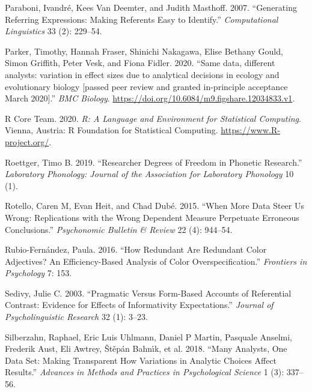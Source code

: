 \documentclass[
  12pt,
]{article}
\newlength{\cslhangindent}
\newenvironment{CSLReferences}[2] %
 {%
  \setlength{\parindent}{0pt}
  \ifodd #1 \everypar{\setlength{\hangindent}{\cslhangindent}}\ignorespaces\fi
  \ifnum #2 > 0
  \setlength{\parskip}{#2\baselineskip}
  \fi
 }%
 {}
\begin{document}
\begin{CSLReferences}{1}{0}
\leavevmode{}%
Paraboni, Ivandré, Kees Van Deemter, and Judith Masthoff. 2007. {``Generating Referring Expressions: Making Referents Easy to Identify.''} \emph{Computational Linguistics} 33 (2): 229--54.

\leavevmode{}%
Parker, Timothy, Hannah Fraser, Shinichi Nakagawa, Elise Bethany Gould, Simon Griffith, Peter Vesk, and Fiona Fidler. 2020. {``{Same data, different analysts: variation in effect sizes due to analytical decisions in ecology and evolutionary biology {[}passed peer review and granted in-principle acceptance March 2020{]}}.''} \emph{BMC Biology}. \url{https://doi.org/10.6084/m9.figshare.12034833.v1}.

\leavevmode{}%
R Core Team. 2020. \emph{R: A Language and Environment for Statistical Computing}. Vienna, Austria: R Foundation for Statistical Computing. \url{https://www.R-project.org/}.

\leavevmode{}%
Roettger, Timo B. 2019. {``Researcher Degrees of Freedom in Phonetic Research.''} \emph{Laboratory Phonology: Journal of the Association for Laboratory Phonology} 10 (1).

\leavevmode{}%
Rotello, Caren M, Evan Heit, and Chad Dubé. 2015. {``When More Data Steer Us Wrong: {R}eplications with the Wrong Dependent Measure Perpetuate Erroneous Conclusions.''} \emph{Psychonomic Bulletin \& Review} 22 (4): 944--54.

\leavevmode{}%
Rubio-Fernández, Paula. 2016. {``How Redundant Are Redundant Color Adjectives? An Efficiency-Based Analysis of Color Overspecification.''} \emph{Frontiers in Psychology} 7: 153.

\leavevmode{}%
Sedivy, Julie C. 2003. {``Pragmatic Versus Form-Based Accounts of Referential Contrast: Evidence for Effects of Informativity Expectations.''} \emph{Journal of Psycholinguistic Research} 32 (1): 3--23.

\leavevmode{}%
Silberzahn, Raphael, Eric Luis Uhlmann, Daniel P Martin, Pasquale Anselmi, Frederik Aust, Eli Awtrey, Štěpán Bahnı́k, et al. 2018. {``Many Analysts, One Data Set: Making Transparent How Variations in Analytic Choices Affect Results.''} \emph{Advances in Methods and Practices in Psychological Science} 1 (3): 337--56.


\end{CSLReferences}
\end{document}
